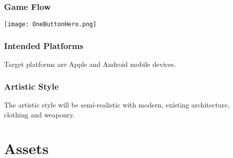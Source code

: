 \documentclass[11pt,fleqn]{book} %
\begin{document}
\section{Game Flow}
\begin{center}
		\texttt{[image: OneButtonHero.png]}
\end{center}
\vspace{-\baselineskip}

\section{Intended Platforms}

Target platforms are Apple and Android mobile devices.

\section{Artistic Style}

The artistic style will be semi-realistic with modern, existing architecture, clothing and weaponry.









\part{Assets}

\end{document}
